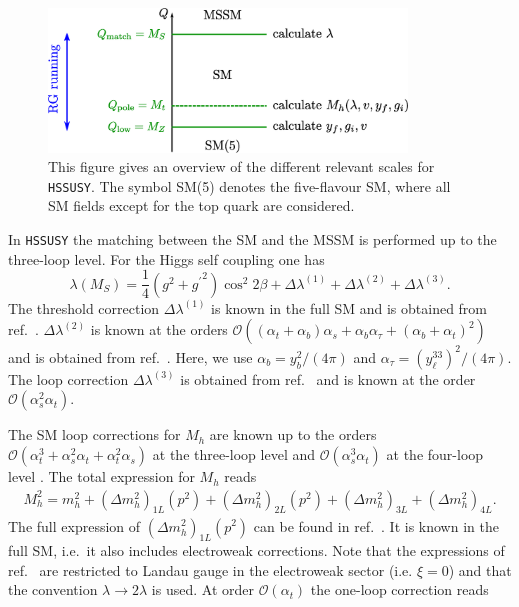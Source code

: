 \documentclass[a4paper,12pt]{book}
\begin{document}
\begin{figure}[h]
\begin{center}
\includegraphics[width=0.85\textwidth]{src/img/scales_HSSUSY.eps}
\caption{This figure gives an overview of the different relevant scales for \texttt{HSSUSY}. The symbol SM(5) denotes the five-flavour SM, where all SM fields except for the top quark are considered.}
\label{fig::scales}
\end{center}
\end{figure}\par
In \texttt{HSSUSY} the matching between the SM and the MSSM is performed up to the three-loop level. For the Higgs self coupling one has 
\begin{equation}
\label{eq::lambdaMS}
\lambda(M_S) = \frac{1}{4}(g^2+{g^\prime}^2)\cos^2 2\beta + \Delta\lambda^{(1)} + \Delta\lambda^{(2)}+ \Delta\lambda^{(3)}. 
\end{equation}
The threshold correction $\Delta\lambda^{(1)}$ is known in the full SM and is obtained from ref.\ \cite{uncertainty}. $\Delta\lambda^{(2)}$ is known at the orders $\mathcal{O}((\alpha_t+\alpha_b)\alpha_s+\alpha_b\alpha_\tau+(\alpha_b+\alpha_t)^2)$ and is obtained from ref.\ \cite{uncertainty,lambda2}. Here, we use $\alpha_b= y_b^2/(4\pi)$ and $\alpha_\tau = (y_\ell^{33})^2/(4\pi)$. The loop correction $\Delta\lambda^{(3)}$ is obtained from ref.\ \cite{lambda3} and is known at the order $\mathcal{O}(\alpha_s^2\alpha_t)$.\par
The SM loop corrections for $M_h$ are known up to the orders $\mathcal{O}(\alpha_t^3 + \alpha_s^2 \alpha_t + \alpha_t^2 \alpha_s)$ at the three-loop level and $\mathcal{O}(\alpha_s^3\alpha_t)$ at the four-loop level \cite{martinHiggs1L,martinHiggs4L,susyhd}. The total expression for $M_h$ reads
\begin{align}
\label{eq::Higgspolemass}
M_h^2 = m_h^2 + (\Delta m_h^2)_{1L}(p^2) + (\Delta m_h^2)_{2L}(p^2) +(\Delta m_h^2)_{3L}+ (\Delta m_h^2)_{4L}.
\end{align}
The full expression of $(\Delta m_h^2)_{1L}(p^2)$ can be found in ref.\ \cite{martinHiggs1L}. It is known in the full SM, i.e.\ it also includes electroweak corrections. Note that the expressions of ref.\ \cite{martinHiggs1L} are restricted to Landau gauge in the electroweak sector (i.e. $\xi=0$) and that the convention $\lambda \rightarrow 2\lambda$ is used. At order $\mathcal{O}(\alpha_t)$ the one-loop correction reads
\end{document}
